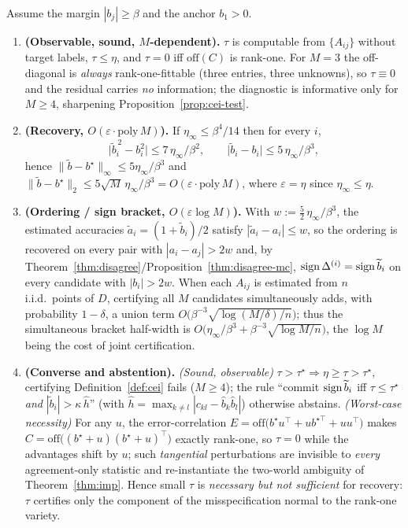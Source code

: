 \begin{theorem}\label{thm:multicand-residual}
Assume the margin $|b_j|\ge\beta$ and the anchor $b_1>0$.
\begin{enumerate}
\item[\textup{(a)}] \textbf{(Observable, sound, $M$-dependent).} $\tau$ is
computable from $\{A_{ij}\}$ without target labels, $\tau\le\eta$, and $\tau=0$
iff $\mathrm{off}(C)$ is rank-one. For $M{=}3$ the off-diagonal is \emph{always}
rank-one-fittable (three entries, three unknowns), so $\tau\equiv0$ and the
residual carries \emph{no} information; the diagnostic is informative only for
$M\ge4$, sharpening Proposition~\ref{prop:cei-test}.
\item[\textup{(b)}] \textbf{(Recovery, $O(\varepsilon\cdot\mathrm{poly}\,M)$).}
If $\eta_\infty\le\beta^4/14$ then for every $i$,
\[
\bigl|\widetilde b_i^{\,2}-b_i^2\bigr|\le 7\,\eta_\infty/\beta^2,
\qquad
\bigl|\widetilde b_i-b_i\bigr|\le 5\,\eta_\infty/\beta^3,
\]
hence $\|\widetilde b-b^\star\|_\infty\le5\eta_\infty/\beta^3$ and
$\|\widetilde b-b^\star\|_2\le 5\sqrt{M}\,\eta_\infty/\beta^3
=O(\varepsilon\cdot\mathrm{poly}\,M)$, where $\varepsilon=\eta$ since
$\eta_\infty\le\eta$.
\item[\textup{(c)}] \textbf{(Ordering / sign bracket, $O(\varepsilon\log M)$).}
With $w:=\tfrac52\,\eta_\infty/\beta^3$, the estimated accuracies
$\widetilde a_i=(1+\widetilde b_i)/2$ satisfy $|\widetilde a_i-a_i|\le w$, so the
ordering is recovered on every pair with $|a_i-a_j|>2w$ and, by
Theorem~\ref{thm:disagree}/Proposition~\ref{thm:disagree-mc},
$\operatorname{sign}\Delta^{(i)}=\operatorname{sign}\widetilde b_i$ on every candidate with $|b_i|>2w$. When
each $A_{ij}$ is estimated from $n$ i.i.d.\ points of $D$, certifying all $M$
candidates simultaneously adds, with probability $1-\delta$, a union term
$O\!\bigl(\beta^{-3}\sqrt{\log(M/\delta)/n}\bigr)$; thus the simultaneous
bracket half-width is
$O\!\bigl(\eta_\infty/\beta^3+\beta^{-3}\sqrt{\log M/n}\bigr)$, the $\log M$
being the cost of joint certification.
\item[\textup{(d)}] \textbf{(Converse and abstention).} \emph{(Sound, observable)}
$\tau>\tau^\star\Rightarrow\eta\ge\tau>\tau^\star$, certifying
Definition~\ref{def:cei} fails ($M\ge4$); the rule
``commit $\operatorname{sign}\widetilde b_i$ iff $\tau\le\tau^\star$ \emph{and}
$|\widetilde b_i|>\kappa\,\widehat h$'' (with
$\widehat h=\max_{k\neq l}|c_{kl}-\widehat b_k\widehat b_l|$) otherwise abstains.
\emph{(Worst-case necessity)} For any $u$, the error-correlation
$E=\mathrm{off}\!\bigl(b^\star u^\top+u b^{\star\top}+uu^\top\bigr)$ makes
$C=\mathrm{off}\!\bigl((b^\star{+}u)(b^\star{+}u)^\top\bigr)$ exactly rank-one, so
$\tau=0$ while the advantages shift by $u$; such \emph{tangential}
perturbations are invisible to \emph{every} agreement-only statistic and
re-instantiate the two-world ambiguity of Theorem~\ref{thm:imp}. Hence small
$\tau$ is \emph{necessary but not sufficient} for recovery: $\tau$ certifies only
the component of the misspecification normal to the rank-one variety.
\end{enumerate}
\end{theorem}

